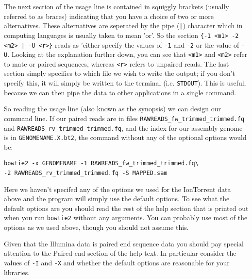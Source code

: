 \documentclass[11pt]{article}
\begin{document}
The next section of the usage line is contained in squiggly brackets (usually
referred to as braces) indicating that you have a choice of two or more
alternatives. These alternatives are seperated by the pipe (\texttt{|}) character
which in computing languages is usually taken to mean 'or'. So the section 
\texttt{\{-1 <m1> -2 <m2> | -U <r>\}} reads as 'either specify the values of \texttt{-1} and
\texttt{-2} or the value of \texttt{-U}. Looking at the explanation further down, you can
see that \texttt{<m1>} and \texttt{<m2>} refer to mate or paired sequences, whereas \texttt{<r>}
refers to unpaired reads. The last section simply specifies to which file we
wish to write the output; if you don't specify this, it will simply be
written to the terminal (i.e. \texttt{STDOUT}). This is useful, because we can then
pipe the data to other applications in a single command.

So reading the usage line (also known as the synopsis) we can design our
command line. If our paired reads are in files
\texttt{RAWREADS\_fw\_trimmed\_trimmed.fq} and 
\texttt{RAWREADS\_rv\_trimmed\_trimmed.fq}, and the index for our assembly genome is in 
\texttt{GENOMENAME.X.bt2}, the command without any of the optional options would be:

\begin{verbatim}
bowtie2 -x GENOMENAME -1 RAWREADS_fw_trimmed_trimmed.fq\
-2 RAWREADS_rv_trimmed_trimmed.fq -S MAPPED.sam
\end{verbatim}

Here we haven't specifed any of the options we used for the IonTorrent data
above and the program will simply use the default options. To see what the
default options are you should read the rest of the help section that is
printed out when you run \texttt{bowtie2} without any arguments. You can probably
use most of the options as we used above, though you should not assume this.

Given that the Illumina data is paired end sequence data you should pay
special attention to the Paired-end section of the help text. In particular
consider the values of \texttt{-I} and \texttt{-X} and whether the default options are
reasonable for your libraries.
\end{document}
